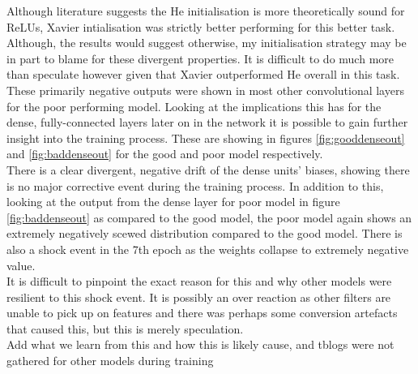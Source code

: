 \documentclass{article}
\begin{document}
Although literature suggests the He initialisation is more theoretically sound for ReLUs, Xavier intialisation was strictly better performing for this better task. Although, the results would suggest otherwise, my initialisation strategy may be in part to blame for these divergent properties. It is difficult to do much more than speculate however given that Xavier outperformed He overall in this task. \\

These primarily negative outputs were shown in most other convolutional layers for the poor performing model. Looking at the implications this has for the dense, fully-connected layers later on in the network it is possible to gain further insight into the training process. These are showing in figures \ref{fig:gooddenseout} and \ref{fig:baddenseout} for the good and poor model respectively. \\

There is a clear divergent, negative drift of the dense units' biases, showing there is no major corrective event during the training process. In addition to this, looking at the output from the dense layer for poor model in figure \ref{fig:baddenseout} as compared to the good model, the poor model again shows an extremely negatively scewed distribution compared to the good model. There is also a shock event in the 7th epoch as the weights collapse to extremely negative value.\\

It is difficult to pinpoint the exact reason for this and why other models were resilient to this shock event. It is possibly an over reaction as other filters are unable to pick up on features and there was perhaps some conversion artefacts that caused this, but this is merely speculation. \\

Add what we learn from this and how this is likely cause, and tblogs were not gathered for other models during training
\end{document}
